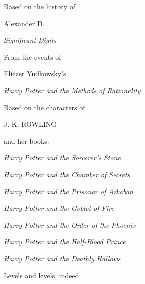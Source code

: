 \cleartoverso
\thispagestyle{empty}
\begin{center}
\vspace*{1.0cm}
Based on the history of
\vspace*{0.5cm}\par
\Large Alexander D. \normalsize\par
\vspace*{0.2cm}
\textit{Significant Digits}\smallskip\par
\vspace*{0.5cm}
From the events of
\vspace*{0.2cm}\par
\Large Eliezer Yudkowsky's \normalsize\par
\vspace*{0.2cm}
\textit{Harry Potter and the Methods of Rationality}\smallskip\par
\vspace*{0.5cm}\par
Based on the characters of
\vspace*{0.2cm}\par
\Large J. K. ROWLING\normalsize\par
\vspace*{0.2cm}
and her books:\par
\vspace*{0.2cm}
\def \hpOrigSeriesBook #1{  
	\textit{Harry Potter and the #1}\smallskip\par
}
\hpOrigSeriesBook{Sorcerer’s Stone}
\hpOrigSeriesBook{Chamber of Secrets}
\hpOrigSeriesBook{Prisoner of Azkaban}
\hpOrigSeriesBook{Goblet of Fire}
\hpOrigSeriesBook{Order of the Phoenix}
\hpOrigSeriesBook{Half-Blood Prince}
\hpOrigSeriesBook{Deathly Hallows}
\vspace*{1cm}
\normalsize Levels and levels, indeed \par
\vspace*{1cm}
\end{center}
\clearpage
